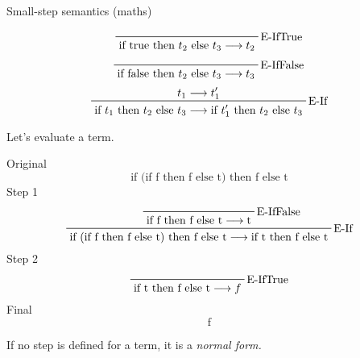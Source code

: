 \documentclass{beamer}
\begin{document}
\begin{frame}[c]
  \begin{center}
Small-step semantics (maths)
  \end{center}
  \begin{displaymath}
    \prftree[r]{E-IfTrue}
    {\text{if true then $t_2$ else $t_3$} \longrightarrow t_2}
  \end{displaymath}
  \begin{displaymath}
    \prftree[r]{E-IfFalse}
    {\text{if false then $t_2$ else $t_3$} \longrightarrow t_3}
  \end{displaymath}
  \begin{displaymath}
    \prftree[r]{E-If}
    {t_1 \longrightarrow t_1^{\prime}}
    {\text{if $t_1$ then $t_2$ else $t_3$} \longrightarrow \text{if $t_1^{\prime}$ then $t_2$ else $t_3$}}
  \end{displaymath}
\end{frame}

\begin{frame}[c]
  \begin{center}
Let's evaluate a term.
  \end{center}
\end{frame}

\begin{frame}[c]
Original
  \begin{displaymath}
    \text{if (if f then f else t) then f else t}
  \end{displaymath}
Step 1
  \begin{displaymath}
    \prftree[r]{E-If}
    {\prftree[r]{E-IfFalse}{\text{if f then f else t} \longrightarrow \text{t}}}
    {\text{if (if f then f else t) then f else t} \longrightarrow \text{if t then f else
      t}}
  \end{displaymath}
Step 2
  \begin{displaymath}
    \prftree[r]{E-IfTrue}
    {\text{if t then f else t} \longrightarrow f}
  \end{displaymath}
Final
  \begin{displaymath}
    \text{f}
  \end{displaymath}
\end{frame}

\begin{frame}[c]
  \begin{center}
If no step is defined for a term, it is a \em{normal form}.
  \end{center}
\end{frame}
\end{document}
